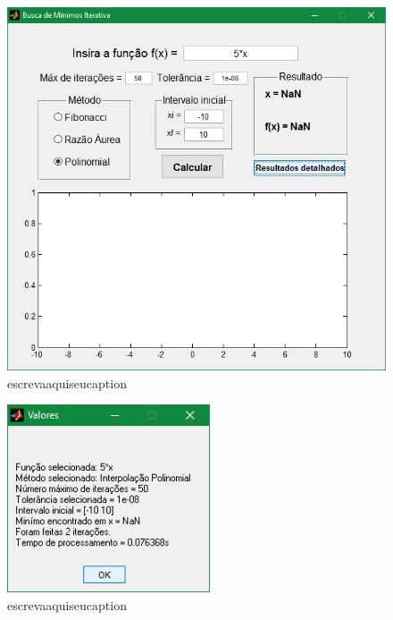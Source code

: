 \begin{figure}[H]
	\begin{center}	
		\includegraphics[width=14cm]{../interpol/f3_gui.PNG}
		\caption{escrevaaquiseucaption}
		\label{fig:f3_gui}
	\end{center}
\end{figure}

\begin{figure}[H]
	\begin{center}	
		\includegraphics[width=6cm]{../interpol/f3_resultados.PNG}
		\caption{escrevaaquiseucaption}
		\label{fig:f3_resultados}
	\end{center}
\end{figure}

